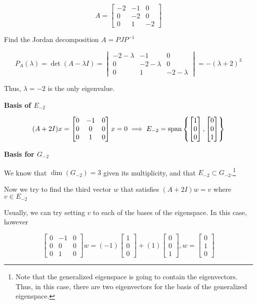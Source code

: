 \begin{example}
	\[A = \begin{bmatrix}
		-2&-1&0\\0&-2&0\\0&1&-2
	\end{bmatrix}\]

	Find the Jordan decomposition $A = PJP^{-1}$
\end{example}
\begin{sol}
	\[P_A(\lambda) = \det(A - \lambda I) = \begin{vmatrix}
		-2-\lambda&-1&0\\0&-2-\lambda&0\\0&1&-2-\lambda
	\end{vmatrix} = - (\lambda+2)^3\]

	Thus, $\lambda = -2$ is the only eigenvalue.

	\bigskip

	\textbf{Basis of $E_{-2}$}

	\[(A + 2 I)x = \begin{bmatrix}
		0&-1&0\\0&0&0\\0&1&0
	\end{bmatrix} x = 0 \implies E_{-2} = \mathrm{span}\left\{\begin{bmatrix}
		1\\0\\0
	\end{bmatrix}, \begin{bmatrix}
		0\\0\\1
	\end{bmatrix}\right\}\]

	\bigskip

	\textbf{Basis for $G_{-2}$}

	We know that $\dim(G_{-2}) = 3$ given its multiplicity, and that $E_{-2} \subset G_{-2}$.\footnote{Note that the generalized eigenspace is going to contain the eigenvectors. Thus, in this case, there are two eigenvectors for the basis of the generalized eigenspace.}

	Now we try to find the third vector $w$ that satisfies $(A + 2I) w = v$ where $v \in E_{-2}$

	Usually, we can try setting $v$ to each of the bases of the eigenspace. In this case, however

	\[\begin{bmatrix}
		0&-1&0\\0&0&0\\0&1&0
	\end{bmatrix} w = (-1) \begin{bmatrix}
		1\\0\\0
	\end{bmatrix} + (1) \begin{bmatrix}
		0\\0\\1
	\end{bmatrix}, w = \begin{bmatrix}
		0\\1\\0
	\end{bmatrix}\]


\end{sol}
